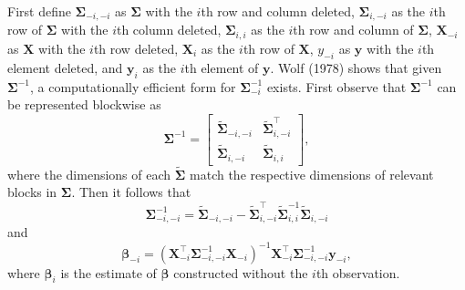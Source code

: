 \documentclass{article}
\begin{document}
First define \(\boldsymbol{\Sigma}_{-i, -i}\) as \(\boldsymbol{\Sigma}\)
with the \(i\)th row and column deleted, \(\boldsymbol{\Sigma}_{i, -i}\)
as the \(i\)th row of \(\boldsymbol{\Sigma}\) with the \(i\)th column
deleted, \(\boldsymbol{\Sigma}_{i, i}\) as the \(i\)th row and column of
\(\boldsymbol{\Sigma}\), \(\mathbf{X}_{-i}\) as \(\mathbf{X}\) with the
\(i\)th row deleted, \(\mathbf{X}_{i}\) as the \(i\)th row of
\(\mathbf{X}\), \(y_{-i}\) as \(\mathbf{y}\) with the \(i\)th element
deleted, and \(\mathbf{y}_i\) as the \(i\)th element of \(\mathbf{y}\).
Wolf (1978) shows that given \(\boldsymbol{\Sigma}^{-1}\), a
computationally efficient form for \(\boldsymbol{\Sigma}^{-1}_{-i}\)
exists. First observe that \(\boldsymbol{\Sigma}^{-1}\) can be
represented blockwise as \begin{equation*}
 \boldsymbol{\Sigma}^{-1} = 
 \begin{bmatrix}
  \tilde{\boldsymbol{\Sigma}}_{-i, -i} & \tilde{\boldsymbol{\Sigma}}_{i,-i}^\top \\
  \tilde{\boldsymbol{\Sigma}}_{i,-i} & \tilde{\boldsymbol{\Sigma}}_{i, i}
 \end{bmatrix},
\end{equation*} where the dimensions of each
\(\tilde{\boldsymbol{\Sigma}}\) match the respective dimensions of
relevant blocks in \(\boldsymbol{\Sigma}\). Then it follows that
\begin{equation*}
 \boldsymbol{\Sigma}^{-1}_{-i, -i} = \tilde{\boldsymbol{\Sigma}}_{-i, -i} - \tilde{\boldsymbol{\Sigma}}_{i,-i}^\top \tilde{\boldsymbol{\Sigma}}_{i, i}^{-1}\tilde{\boldsymbol{\Sigma}}_{i,-i}
\end{equation*} and \begin{equation*}
  \boldsymbol{\beta}_{-i} = (\mathbf{X}^\top_{-i} \boldsymbol{\Sigma}^{-1}_{-i, -i} \mathbf{X}_{-i})^{-1} \mathbf{X}^\top_{-i} \boldsymbol{\Sigma}^{-1}_{-i, -i} \mathbf{y}_{-i},
\end{equation*} where \(\boldsymbol{\beta}_i\) is the estimate of
\(\boldsymbol{\beta}\) constructed without the \(i\)th observation.
\end{document}
